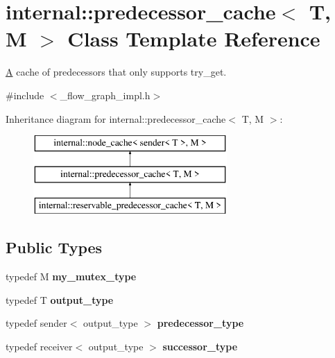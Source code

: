 \hypertarget{classinternal_1_1predecessor__cache}{}\section{internal\+:\+:predecessor\+\_\+cache$<$ T, M $>$ Class Template Reference}
\label{classinternal_1_1predecessor__cache}


\hyperlink{structA}{A} cache of predecessors that only supports try\+\_\+get.  




{\ttfamily \#include $<$\+\_\+flow\+\_\+graph\+\_\+impl.\+h$>$}

Inheritance diagram for internal\+:\+:predecessor\+\_\+cache$<$ T, M $>$\+:\begin{figure}[H]
\begin{center}
\leavevmode
\includegraphics[height=3.000000cm]{classinternal_1_1predecessor__cache}
\end{center}
\end{figure}
\subsection*{Public Types}
\begin{DoxyCompactItemize}
\item 
\hypertarget{classinternal_1_1predecessor__cache_a66a305c8eacba759434293408846b042}{}typedef M {\bfseries my\+\_\+mutex\+\_\+type}\label{classinternal_1_1predecessor__cache_a66a305c8eacba759434293408846b042}

\item 
\hypertarget{classinternal_1_1predecessor__cache_a33e5ada3a1c4982feb05e29b213e6d85}{}typedef T {\bfseries output\+\_\+type}\label{classinternal_1_1predecessor__cache_a33e5ada3a1c4982feb05e29b213e6d85}

\item 
\hypertarget{classinternal_1_1predecessor__cache_a27ca568c7506123ec763fffd3cb50b12}{}typedef sender$<$ output\+\_\+type $>$ {\bfseries predecessor\+\_\+type}\label{classinternal_1_1predecessor__cache_a27ca568c7506123ec763fffd3cb50b12}

\item 
\hypertarget{classinternal_1_1predecessor__cache_a458b4d176b3e3c903192346245d99359}{}typedef receiver$<$ output\+\_\+type $>$ {\bfseries successor\+\_\+type}\label{classinternal_1_1predecessor__cache_a458b4d176b3e3c903192346245d99359}

\end{DoxyCompactItemize}
